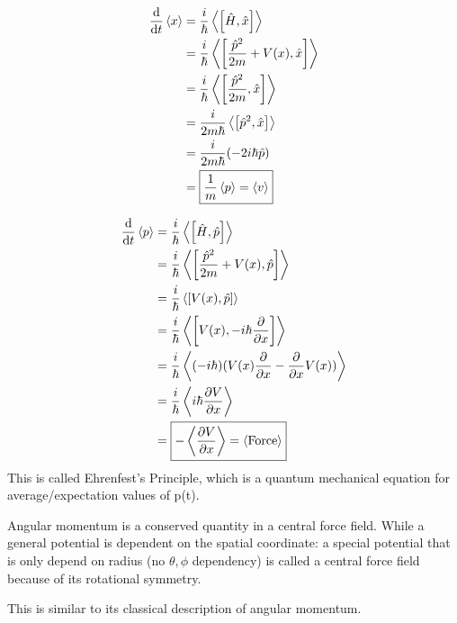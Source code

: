 \documentclass{school-22.101-notes}
\date{October 12, 2011}
\begin{document}
\maketitle


\begin{align}
\frac{\mathrm{d}}{\mathrm{d}t} \left< x \right> &= \frac{i}{\hbar} \left< \left[ \hat{H}, \hat{x} \right] \right> \\
&= \frac{i}{\hbar} \left< \left[ \frac{\hat{p}^2}{2m} + V(x), \hat{x} \right] \right> \\
&= \frac{i}{\hbar} \left< \left[ \frac{\hat{p}^2}{2m} , \hat{x} \right] \right> \\
&= \frac{i}{2m\hbar} \left< \left[ \hat{p}^2 , \hat{x} \right] \right> \\
&= \frac{i}{2m\hbar} (-2i\hbar \hat{p} ) \\
&= \boxed{\frac{1}{m} \left< p \right> = \left< v \right>}
\end{align}


\begin{align}
\frac{\mathrm{d}}{\mathrm{d}t} \left< p \right> &= \frac{i}{\hbar} \left< \left[ \hat{H}, \hat{p} \right] \right> \\
&= \frac{i}{\hbar} \left< \left[ \frac{\hat{p}^2}{2m} + V(x), \hat{p} \right] \right> \\
&= \frac{i}{\hbar} \left< \left[ V(x) , \hat{p} \right] \right> \\
&= \frac{i}{\hbar} \left< \left[ V(x), - i\hbar \frac{\partial}{\partial x} \right] \right> \\
&= \frac{i}{\hbar} \left< (-i\hbar) (V(x) \frac{\partial}{\partial x} - \frac{\partial}{\partial x} V(x)) \right> \\
&= \frac{i}{\hbar} \left< i\hbar\frac{\partial V}{\partial x} \right> \\
&= \boxed{- \left< \frac{\partial V}{\partial x} \right> = \left< \mathrm{Force} \right> }
\end{align}
This is called Ehrenfest's Principle, which is a quantum mechanical equation for average/expectation values of p(t). 

Angular momentum is a conserved quantity in a central force field. While a general potential is dependent on the spatial coordinate:
a special potential that is only depend on radius (no $\theta, \phi$ dependency) is called a central force field because of its rotational symmetry. 


This is similar to its classical description of angular momentum. 
\end{document}
